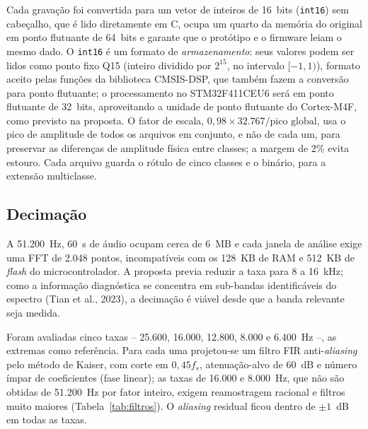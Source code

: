\documentclass[12pt,a4paper]{article}
\begin{document}
Cada gravação foi convertida para um vetor de inteiros de 16~bits (\texttt{int16}) sem cabeçalho, que é lido diretamente em C, ocupa um quarto da memória do original em ponto flutuante de 64~bits e garante que o protótipo e o firmware leiam o mesmo dado. O \texttt{int16} é um formato de \emph{armazenamento}: seus valores podem ser lidos como ponto fixo Q15 (inteiro dividido por $2^{15}$, no intervalo $[-1,1)$), formato aceito pelas funções da biblioteca CMSIS-DSP, que também fazem a conversão para ponto flutuante; o processamento no STM32F411CEU6 será em ponto flutuante de 32~bits, aproveitando a unidade de ponto flutuante do Cortex-M4F, como previsto na proposta. O fator de escala, $0{,}98 \times 32.767 / \text{pico global}$, usa o pico de amplitude de todos os arquivos em conjunto, e não de cada um, para preservar as diferenças de amplitude física entre classes; a margem de 2\% evita estouro. Cada arquivo guarda o rótulo de cinco classes e o binário, para a extensão multiclasse.

\subsection{Decimação}
\label{sec:decimacao}

A 51.200~Hz, 60~s de áudio ocupam cerca de 6~MB e cada janela de análise exige uma FFT de 2.048 pontos, incompatíveis com os 128~KB de RAM e 512~KB de \emph{flash} do microcontrolador. A proposta previa reduzir a taxa para 8 a 16~kHz; como a informação diagnóstica se concentra em sub-bandas identificáveis do espectro (Tian et al., 2023), a decimação é viável desde que a banda relevante seja medida.

Foram avaliadas cinco taxas -- 25.600, 16.000, 12.800, 8.000 e 6.400~Hz --, as extremas como referência. Para cada uma projetou-se um filtro FIR anti-\emph{aliasing} pelo método de Kaiser, com corte em $0{,}45 f_s$, atenuação-alvo de 60~dB e número ímpar de coeficientes (fase linear); as taxas de 16.000 e 8.000~Hz, que não são obtidas de 51.200~Hz por fator inteiro, exigem reamostragem racional e filtros muito maiores (Tabela~\ref{tab:filtros}). O \emph{aliasing} residual ficou dentro de $\pm 1$~dB em todas as taxas.
\end{document}
